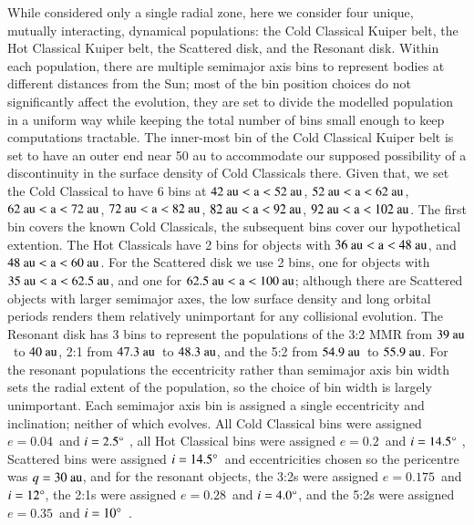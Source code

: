 \documentclass[printer]{aa}
\begin{document}
While \citet{2015ApJ...801...15S, 2016ApJ...818..175S} considered only a single radial zone, here we consider four unique, mutually interacting, dynamical populations: the Cold Classical Kuiper belt, the Hot Classical Kuiper belt, the Scattered disk, and the Resonant disk.  Within each population, there are multiple semimajor axis bins to represent bodies at different distances from the Sun; most of the bin position choices do not significantly affect the evolution, they are set to divide the modelled population in a uniform way while keeping the total number of bins small enough to keep computations tractable.  The  inner-most bin of the Cold Classical Kuiper belt is set to have an outer end near 50 au to accommodate our supposed possibility of a discontinuity in the surface density of Cold Classicals there.  Given that, we set the Cold Classical to have 6 bins at $42~\rm{au} < a < 52~\rm{au}$, $52~\rm{au} < a < 62~\rm{au}$, $62~\rm{au} < a < 72~\rm{au}$, $72~\rm{au} < a < 82~\rm{au}$, $82~\rm{au} < a < 92~\rm{au}$, $92~\rm{au} < a < 102~\rm{au}$.  The first bin covers the known Cold Classicals, the subsequent bins cover our hypothetical extention.  The Hot Classicals have 2 bins for objects with $36~\rm{au} < a < 48~\rm{au}$, and $48~\rm{au} < a < 60~\rm{au}$.  For the Scattered disk we use 2 bins, one for objects with $35~\rm{au} < a < 62.5~\rm{au}$, and one for $62.5~\rm{au} < a < 100~\rm{au}$; although there are Scattered objects with larger semimajor axes, the low surface density and long orbital periods renders them relatively unimportant for any collisional evolution.  The Resonant disk has 3 bins to represent the populations of the 3:2 MMR from $39~\rm{au}$~to $40~\rm{au}$, 2:1 from $47.3~\rm{au}$~to $48.3~\rm{au}$, and the 5:2 from $54.9~\rm{au}$~to $55.9~\rm{au}$.  For the resonant populations the eccentricity rather than semimajor axis bin width sets the radial extent of the population, so the choice of bin width is largely unimportant.  Each semimajor axis bin is assigned a single eccentricity and inclination; neither of which evolves.  All Cold Classical bins were assigned $e = 0.04$~and $i = 2.5 \degree$ \citep{2011AJ....142..131P}, all Hot Classical bins were assigned $e = 0.2$~and $i = 14.5 \degree$ \citep{2017AJ....153..236P}, Scattered bins were assigned $i = 14.5 \degree$~and eccentricities chosen so the pericentre was $q = 30~\rm{au}$, and for the resonant objects, the 3:2s were assigned $e = 0.175$~and $i = 12 \degree$, the 2:1s were assigned $e = 0.28$~and $i = 4.0 \degree$, and the 5:2s were assigned $e = 0.35$~and $i = 10\degree$~\citep{2016AJ....152...23V}.
\end{document}
